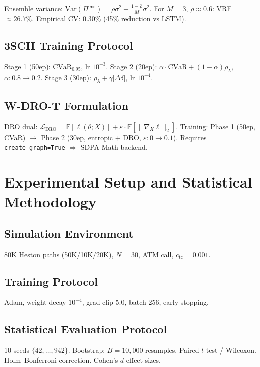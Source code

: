\documentclass[11pt]{article}
\newcommand{\E}{\mathbb{E}}
\newcommand{\cvar}{\mathrm{CVaR}}
\begin{document}
Ensemble variance: $\mathrm{Var}(\Pi^{\mathrm{ens}}) = \bar\rho\bar\sigma^2 + \frac{1-\bar\rho}{M}\bar\sigma^2$. For $M{=}3$, $\bar\rho{\approx}0.6$: VRF $\approx 26.7\%$. Empirical CV: 0.30\% (45\% reduction vs LSTM).

\subsection{3SCH Training Protocol}
Stage 1 (50ep): $\cvar_{0.95}$, lr $10^{-3}$. Stage 2 (20ep): $\alpha\cdot\cvar + (1{-}\alpha)\rho_\lambda$, $\alpha{:}0.8{\to}0.2$. Stage 3 (30ep): $\rho_\lambda + \gamma|\Delta\delta|$, lr $10^{-4}$.

\subsection{W-DRO-T Formulation}
DRO dual: $\mathcal{L}_{\mathrm{DRO}} = \E[\ell(\theta; X)] + \varepsilon \cdot \E[\|\nabla_X \ell\|_2]$. Training: Phase 1 (50ep, CVaR) $\to$ Phase 2 (30ep, entropic + DRO, $\varepsilon{:}0{\to}0.1$). Requires \texttt{create\_graph=True} $\Rightarrow$ SDPA Math backend.

\section{Experimental Setup and Statistical Methodology}

\subsection{Simulation Environment}
80K Heston paths (50K/10K/20K), $N{=}30$, ATM call, $c_{\mathrm{tc}}{=}0.001$.

\subsection{Training Protocol}
Adam, weight decay $10^{-4}$, grad clip 5.0, batch 256, early stopping.

\subsection{Statistical Evaluation Protocol}
10 seeds $\{42,\ldots,942\}$. Bootstrap: $B{=}10{,}000$ resamples. Paired $t$-test / Wilcoxon. Holm--Bonferroni correction. Cohen's $d$ effect sizes.
\end{document}
